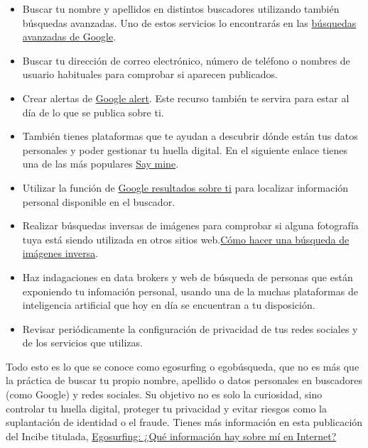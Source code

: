 \documentclass[
  spanish,
  a4paper,
  openany]{book}
\begin{document}
\begin{itemize}
\item
  Buscar tu nombre y apellidos en distintos buscadores utilizando también búsquedas avanzadas. Uno de estos servicios lo encontrarás en las \href{https://support.google.com/websearch/answer/2466433?hl=es}{búsquedas avanzadas de Google}.
\item
  Buscar tu dirección de correo electrónico, número de teléfono o nombres de usuario habituales para comprobar si aparecen publicados.
\item
  Crear alertas de \href{https://www.google.es/alerts}{Google alert}. Este recurso también te servira para estar al día de lo que se publica sobre ti.
\item
  También tienes plataformas que te ayudan a descubrir dónde están tus datos personales y poder gestionar tu huella digital. En el siguiente enlace tienes una de las más populares \href{https://saymine.com/}{Say mine}.
\item
  Utilizar la función de \href{https://myactivity.google.com/results-about-you}{Google resultados sobre ti} para localizar información personal disponible en el buscador.
\item
  Realizar búsquedas inversas de imágenes para comprobar si alguna fotografía tuya está siendo utilizada en otros sitios web.\href{https://www.incibe.es/ciudadania/formacion/recursosdescargables/como-hacer-busqueda-imagenes-inversa}{Cómo hacer una búsqueda de imágenes inversa}.
\item
  Haz indagaciones en data brokers y web de búsqueda de personas que están exponiendo tu infomación personal, usando una de la muchas plataformas de inteligencia artificial que hoy en día se encuentran a tu disposición.
\item
  Revisar periódicamente la configuración de privacidad de tus redes sociales y de los servicios que utilizas.
\end{itemize}

Todo esto es lo que se conoce como egosurfing o egobúsqueda, que no es más que la práctica de buscar tu propio nombre, apellido o datos personales en buscadores (como Google) y redes sociales. Su objetivo no es solo la curiosidad, sino controlar tu huella digital, proteger tu privacidad y evitar riesgos como la suplantación de identidad o el fraude. Tienes más información en esta publicación del Incibe titulada, \href{https://www.incibe.es/ciudadania/blog/egosurfing-que-informacion-hay-sobre-mi-en-internet}{Egosurfing: ¿Qué información hay sobre mí en Internet?}
\end{document}
